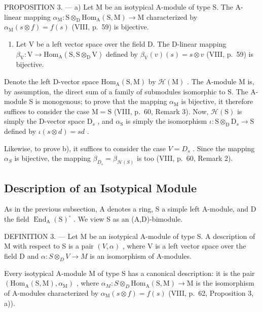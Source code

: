PROPOSITION 3. --- a) Let M be an isotypical A-module of type S. The A-linear mapping \(\alpha_{\mathrm{M}}: \mathrm{S} \otimes_{\mathrm{D}} \mathrm{Hom}_{\mathrm{A}}(\mathrm{S}, \mathrm{M}) \to \mathrm{M}\) characterized by \(\alpha_{\mathrm{M}}(s \otimes f) = f(s)\) (VIII, p.~59) is bijective.

\begin{enumerate}
\def\labelenumi{\alph{enumi})}
\setcounter{enumi}{1}
\tightlist
\item
  Let V be a left vector space over the field D. The D-linear mapping \(\beta_{\mathrm{V}}: \mathrm{V} \to \mathrm{Hom}_{\mathrm{A}}(\mathrm{S}, \mathrm{S} \otimes_{\mathrm{D}} \mathrm{V})\) defined by \(\beta_{\mathrm{V}}(v)(s) = s \otimes v\) (VIII, p.~59) is bijective.
\end{enumerate}

Denote the left D-vector space \(\mathrm{Hom}_{\mathrm{A}}(\mathrm{S},\mathrm{M})\) by \(\mathcal{H}(\mathrm{M})\) . The A-module M is, by assumption, the direct sum of a family of submodules isomorphic to S. The A-module S is monogenous; to prove that the mapping \(\alpha_{\mathrm{M}}\) is bijective, it therefore suffices to consider the case \(\mathrm{M} = \mathrm{S}\) (VIII, p.~60, Remark 3). Now, \(\mathcal{H}(\mathrm{S})\) is simply the D-vector space \(\mathrm{D}_s\) , and \(\alpha_{\mathrm{S}}\) is simply the isomorphism \(\iota : \mathrm{S} \otimes_{\mathrm{D}} \mathrm{D}_s \to \mathrm{S}\) defined by \(\iota(s \otimes d) = sd\) .

Likewise, to prove b), it suffices to consider the case \(V = D_{s}\) . Since the mapping \(\alpha_{S}\) is bijective, the mapping \(\beta_{D_{s}} = \beta_{\mathcal{H}(S)}\) is too (VIII, p.~60, Remark 2).

\subsection{Description of an Isotypical Module}

As in the previous subsection, A denotes a ring, S a simple left A-module, and D the field \(\operatorname{End}_{\mathrm{A}}(\mathrm{S})^{\circ}\) . We view S as an (A,D)-bimodule.

DEFINITION 3. --- Let M be an isotypical A-module of type S. A description of M with respect to S is a pair \((V, \alpha)\) , where V is a left vector space over the field D and \(\alpha : S \otimes_{D} V \to M\) is an isomorphism of A-modules.

Every isotypical A-module M of type S has a canonical description: it is the pair \((\mathrm{Hom}_{\mathrm{A}}(\mathrm{S},\mathrm{M}),\alpha_{\mathrm{M}})\) , where \(\alpha_{M}:S\otimes_{D}\mathrm{Hom}_{\mathrm{A}}(\mathrm{S},\mathrm{M})\to\mathrm{M}\) is the isomorphism of A-modules characterized by \(\alpha_{\mathrm{M}}(s\otimes f)=f(s)\) (VIII, p.~62, Proposition 3, a)).

